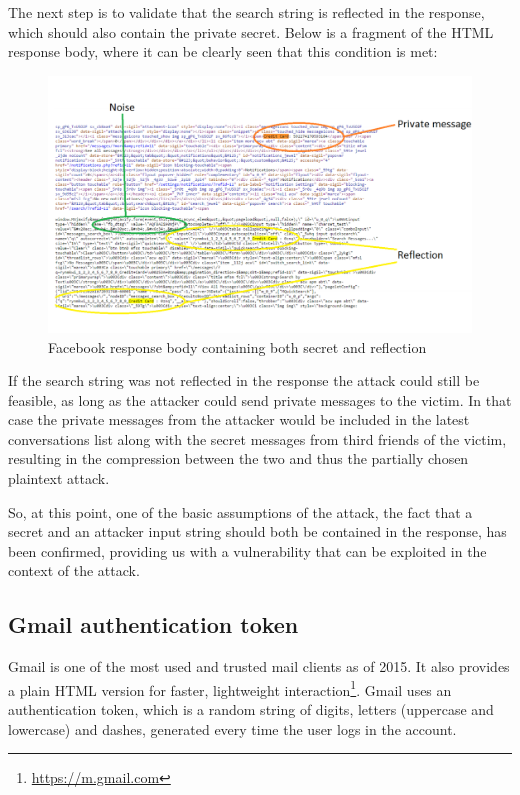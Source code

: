 The next step is to validate that the search string is reflected in the
response, which should also contain the private secret. Below is a fragment of
the HTML response body, where it can be clearly seen that this condition is met:

\begin{figure}[h] \caption{Facebook response body containing both secret and
reflection} \centering
\includegraphics[width=1.1\textwidth]{diagrams/fb_response.png}\end{figure}

If the search string was not reflected in the response the attack could still
be feasible, as long as the attacker could send private messages to the victim.
In that case the private messages from the attacker would be included in the
latest conversations list along with the secret messages from third friends of
the victim, resulting in the compression between the two and thus the partially
chosen plaintext attack.

So, at this point, one of the basic assumptions of the attack, the fact that a
secret and an attacker input string should both be contained in the response,
has been confirmed, providing us with a vulnerability that can be exploited in
the context of the attack.

\subsection{Gmail authentication token}\label{subsec:gmail_token}

Gmail is one of the most used and trusted mail clients as of 2015. It also
provides a plain HTML version for faster, lightweight
interaction\footnote{\url{https://m.gmail.com}}. Gmail uses an authentication
token, which is a random string of digits, letters (uppercase and lowercase) and
dashes, generated every time the user logs in the account.

